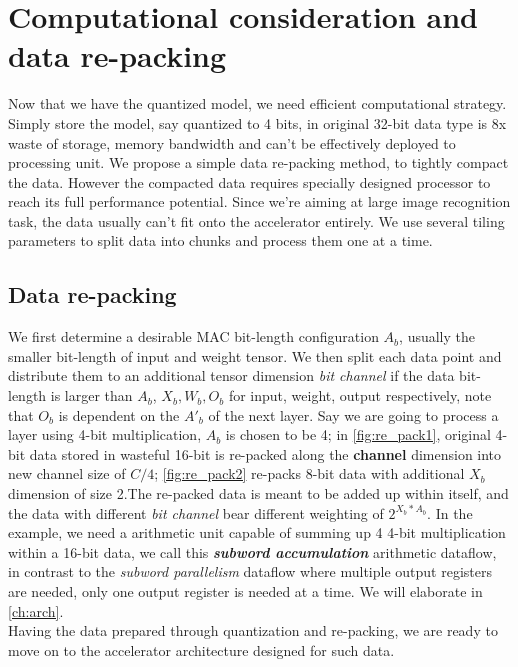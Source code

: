 \section{Computational consideration and data re-packing}
Now that we have the quantized model, we need efficient computational strategy. Simply store the model, say quantized to 4 bits, in original 32-bit data type is 8x waste of storage, memory bandwidth and can't be effectively deployed to processing unit. We propose a simple data re-packing method, to tightly compact the data. However the compacted data requires specially designed processor to reach its full performance potential. Since we're aiming at large image recognition task, the data usually can't fit onto the accelerator entirely. We use several tiling parameters to split data into chunks and process them one at a time.
\subsection{Data re-packing}
We first determine a desirable MAC bit-length configuration \textbf{$A_b$}, usually the smaller bit-length of input and weight tensor. We then split each data point and distribute them to an additional tensor dimension \textit{bit channel} if the data bit-length is larger than \textbf{$A_b$}, \textbf{$X_b,W_b,O_b$} for input, weight, output respectively, note that \textbf{$O_b$} is dependent on the \textbf{$A'_b$} of the next layer. Say we are going to process a layer using 4-bit multiplication, \textbf{$A_b$} is chosen to be 4; in \autoref{fig:re_pack1}, original 4-bit data stored in wasteful 16-bit is re-packed along the \textbf{channel} dimension into new channel size of $C/4$; \autoref{fig:re_pack2} re-packs 8-bit data with additional \textbf{$X_b$} dimension of size 2.The re-packed data is meant to be added up within itself, and the data with different \textit{bit channel} bear different weighting of $2^{X_b*A_b}$. In the example, we need a arithmetic unit capable of summing up 4 4-bit multiplication within a 16-bit data, we call this \textbf{\textit{subword accumulation}} arithmetic dataflow, in contrast to the \textit{subword parallelism} dataflow where multiple output registers are needed, only one output register is needed at a time. We will elaborate in \autoref{ch:arch}.
\\
Having the data prepared through quantization and re-packing, we are ready to move on to the accelerator architecture designed for such data.
